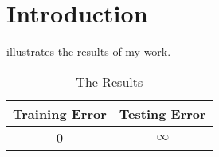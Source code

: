 \chapter{Introduction} \label{Chapter:Introduction}








 illustrates the results of my work.
\begin{table}[!htb]
  \centering
  \begin{tabular}{cc}
  \toprule
  \textbf{Training Error} & \textbf{Testing Error}\\
  \midrule
  0 & $\infty$\\
  \bottomrule
  \end{tabular}
  \caption{The Results}
  \label{Table:tabex}
\end{table}

